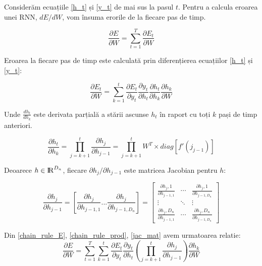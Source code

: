 Considerăm ecuațiile \ref{h_t} și \ref{y_t} de mai sus la pasul $t$. Pentru a calcula eroarea unei RNN, $dE/dW$, vom însuma erorile de la fiecare pas de timp.

\begin{equation}
	\frac{\partial E}{\partial W} = \sum_{t=1}^{T} \frac{\partial E_t}{\partial W}
\end{equation}

Eroarea la fiecare pas de timp este calculată prin diferențierea ecuațiilor  \ref{h_t} și \ref{y_t}:

\begin{equation}
	\frac{\partial E_t}{\partial W} = \sum_{k=1}^{t} \frac{\partial E_t}{\partial y_t} \frac{\partial y_t}{\partial h_t} \frac{\partial h_t}{\partial h_k} \frac{\partial h_k}{\partial W}
	\label{chain_rule_E}
\end{equation}

Unde $\frac{dh_t}{dh_k}$ este derivata parțială a stării ascunse $h_t$ în raport cu toți $k$ pași de timp anteriori.

\begin{equation}
	\frac{\partial h_t}{\partial h_k} = \prod_{j=k+1}^{t} \frac{\partial h_j}{\partial h_{j-1}} = \prod_{j=k+1}^{t} W^T \times diag[f'(j_{j-1})]
	\label{chain_rule_prod}
\end{equation}

Deoarece $h \in {\rm I\!R}^{D_n}$, fiecare $\partial h_j / \partial h_{j-1}$ este matricea Jacobian pentru $h$:

\begin{equation}
	\frac{\partial h_j}{\partial h_{j-1}} = [\frac{\partial h_j}{\partial h_{j-1, 1}} ... \frac{\partial h_j}{\partial h_{j-1,  D_n}}] =\begin{bmatrix}
		\frac{\partial h_j,1}{\partial h_{j-1, 1}} & \cdots & \frac{\partial h_j,1}{\partial h_{j-1,  D_n}}	\\[0.3em]
		\vdots           & \ddots &\vdots	\\[0.3em]
		\frac{\partial h_j,D_n}{\partial h_{j-1, 1}} & \cdots & \frac{\partial h_j,D_n}{\partial h_{j-1, D_n}}
	\end{bmatrix}
	\label{jac_mat}
\end{equation}

Din \ref{chain_rule_E}, \ref{chain_rule_prod}, \ref{jac_mat} avem urmatoarea relatie:
\begin{equation}
	\frac{\partial E}{\partial W} = \sum_{t=1}^{T} \sum_{k=1}^{t} \frac{\partial E_t}{\partial y_t} \frac{\partial y_t}{\partial h_t} (\prod_{j=k+1}^{t} \frac{\partial h_j}{\partial h_{j-1}}) \frac{\partial h_k}{\partial W}
\end{equation}

